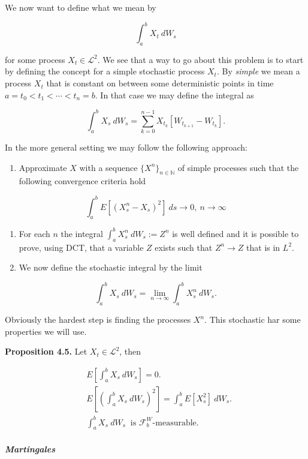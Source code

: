\documentclass[
]{article}
\providecommand{\tightlist}{%
  \setlength{\itemsep}{0pt}\setlength{\parskip}{0pt}}
\begin{document}
We now want to define what we mean by

\[
\int_a^bX_t\ dW_s
\]

for some process \(X_t\in\mathcal{L}^2\). We see that a way to go about
this problem is to start by defining the concept for a simple stochastic
process \(X_t\). By \emph{simple} we mean a process \(X_t\) that is
constant on between some deterministic points in time
\(a=t_0<t_1<\cdots<t_n=b\). In that case we may define the integral as

\[
\int_a^bX_s\ dW_s = \sum_{k=0}^{n-1}X_{t_k}[W_{t_{k+1}}-W_{t_k}].
\]

In the more general setting we may follow the following approach:

\begin{enumerate}
\def\labelenumi{\arabic{enumi}.}
\tightlist
\item
  Approximate \(X\) with a sequence \(\{X^n\}_{n\in\mathbb{N}}\) of
  simple processes such that the following convergence criteria hold
\end{enumerate}

\[
  \int_a^bE[(X_s^n-X_s)^2]\ ds\to 0,\ n\to\infty
  \]

\begin{enumerate}
\def\labelenumi{\arabic{enumi}.}
\setcounter{enumi}{1}
\tightlist
\item
  For each \(n\) the integral \(\int_a^b X_s^n\ dW_s:=Z^n\) is well
  defined and it is possible to prove, using DCT, that a variable \(Z\)
  exists such that \(Z^n\to Z\) that is in \(L^2\).
\item
  We now define the stochastic integral by the limit
\end{enumerate}

\[
  \int_a^b X_s\ dW_s=\lim_{n\to \infty}\int_a^b X_s^n\ dW_s.
  \]

Obviously the hardest step is finding the processes \(X^n\). This
stochastic har some properties we will use.

\textbf{Proposition 4.5.} Let \(X_t\in\mathcal{L}^2\), then

\begin{align*}
&E\left[\int_a^b X_s\ dW_s\right]=0.\tag{4.11}\\
&E\left[\left(\int_a^b X_s\ dW_s\right)^2\right]=\int_a^b E[ X_s^2]\ dW_s.\tag{4.13}\\
&\int_a^b X_s\ dW_s\ \text{ is }\mathcal{F}_b^W\text{-measurable.}\tag{4.14}
\end{align*}

\hypertarget{martingales-1}{%
\subparagraph{Martingales}\label{martingales-1}}
\end{document}
